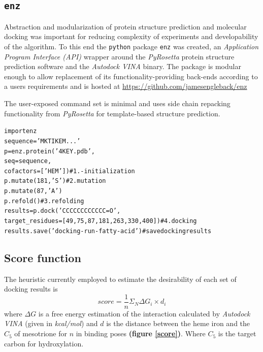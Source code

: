 \documentclass[16pt]{article}
\begin{document}
\subsection{\texttt{enz} \label{enz}}

Abstraction and modularization of protein structure prediction and molecular docking was important for reducing complexity of experiments and developability of the algorithm.
To this end the \texttt{python} package \texttt{enz} was created, an \textit{Application Program Interface (API)} wrapper around the \textit{PyRosetta} \cite{chaudhury2010pyrosetta} protein structure prediction software and the \textit{Autodock VINA} \cite{trott2010autodock} binary.
The package is modular enough to allow replacement of its functionality-providing back-ends according to a users requirements and is hosted at \href{https://github.com/jamesengleback/enz}{https://github.com/jamesengleback/enz}

The user-exposed command set is minimal and uses side chain repacking \cite{dunbrack1993backbone} functionality from \textit{PyRosetta} for template-based structure prediction.

\begin{alltt}
        import enz \\
        sequence = 'MKTIKEM...' \\
        p = enz.protein('4KEY.pdb', 
                        seq=sequence, 
                        cofactors=['HEM']) \# 1. - initialization \\
        p.mutate(181, 'S') \# 2. mutation\\
        p.mutate(87, 'A')\\
        p.refold() \# 3. refolding\\
        results = p.dock('CCCCCCCCCCCC=O', 
                         target\_residues=[49, 75, 87, 181, 263, 330, 400]) \# 4. docking \\
        results.save('docking-run-fatty-acid') \# save docking results
\end{alltt}


\subsection{Score function \label{scorefn}}
The heuristic currently employed to estimate the desirability of each set of docking results is %
\begin{equation}
score = \frac{1}{n}\Sigma _{N} \Delta G_{i} \times d_{i}
\end{equation}
where $\Delta G$ is a free energy estimation of the interaction calculated by \textit{Autodock VINA} (given in \textit{kcal/mol}) and $d$ is the distance between the heme iron and the $C_{5}$ of mesotrione for $ n $ in binding poses \textbf{(figure \ref{score})}. 
Where $C_{5}$ is the target carbon for hydroxylation. 
\end{document}
